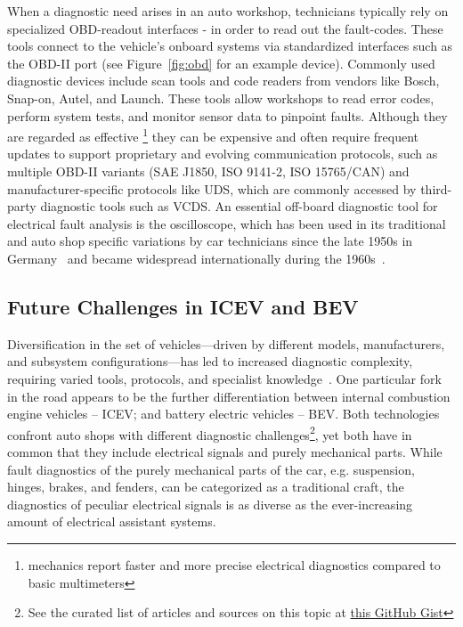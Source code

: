 When a diagnostic need arises in an auto workshop, technicians typically rely on specialized OBD-readout interfaces - in order to read out the fault-codes. 
These tools connect to the vehicle’s onboard systems via standardized interfaces such as the OBD-II port (see Figure~\ref{fig:obd} for an example device). 
Commonly used diagnostic devices include scan tools and code readers from vendors like Bosch, Snap-on, Autel, and Launch. 
These tools allow workshops to read error codes, perform system tests, and monitor sensor data to pinpoint faults. 
Although they are regarded as effective \footnote{mechanics report faster and more precise electrical diagnostics compared to basic 
multimeters\cite{redditscopeefficiency}} they can be expensive and often require frequent updates to support proprietary and evolving communication protocols, 
such as multiple OBD-II variants (SAE J1850, ISO 9141-2, ISO 15765/CAN) and manufacturer-specific protocols like UDS, which are commonly accessed by third-party 
diagnostic tools such as VCDS\cite{obd2protocols, obd2wiki, vcds}.
An essential off-board diagnostic tool for electrical fault analysis is the oscilloscope, 
which has been used in its traditional and auto shop specific variations by car technicians since the late 1950s in Germany~\cite{hameghistory} and became widespread internationally during the 1960s~\cite{autoscopehist}.

\subsection{Future Challenges in ICEV and BEV}
Diversification in the set of vehicles—driven by different models, manufacturers, and subsystem configurations—has led to increased diagnostic complexity, 
requiring varied tools, protocols, and specialist knowledge~\cite{autodiagnosticsdiversity, triddiagnosticcomplexity}. 
One particular fork in the road appears to be the further differentiation between internal combustion engine vehicles – ICEV; and battery electric vehicles – BEV. 
Both technologies confront auto shops with different diagnostic challenges\footnote{See the curated list of articles and sources on this topic at \href{https://gist.github.com/kathamatician/fbc405fd53297b142fcf41163fad2d1e}{this GitHub Gist}},  
yet both have in common that they include electrical signals and purely mechanical parts. 
While fault diagnostics of the purely mechanical parts of the car, e.g. suspension, hinges, brakes, and fenders, can be categorized as a traditional craft, 
the diagnostics of peculiar electrical signals is as diverse as the ever-increasing amount of electrical assistant systems. 


